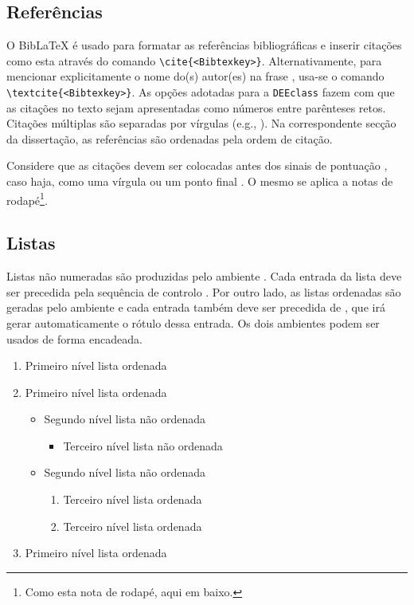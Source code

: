 
\subsection{Referências}

O Bib\LaTeX{} é usado para formatar as referências bibliográficas e inserir citações como esta \cite{Gupta97} através do comando \verb|\cite{<Bibtexkey>}|. Alternativamente, para mencionar explicitamente o nome do(s) autor(es) na frase \textcite{Delorme1995}, usa-se o comando \verb|\textcite{<Bibtexkey>}|. As opções adotadas para a \verb|DEEclass| fazem com que as citações no texto sejam apresentadas como números entre parênteses retos. Citações múltiplas são separadas por vírgulas (e.g., \cite{Lipsum2008,Li2000,Candy1992}). Na correspondente secção da dissertação, as referências são ordenadas pela ordem de citação. 

Considere que as citações \cite{W3C2005,ATmega128A2019} devem ser colocadas antes dos sinais de pontuação \cite{Candy1992}, caso haja, como uma vírgula ou um ponto final \cite{IEA2024}. O mesmo se aplica a notas de rodapé\footnote{Como esta nota de rodapé, aqui em baixo.}.


\subsection{Listas}

Listas não numeradas são produzidas pelo ambiente . Cada entrada da lista deve ser precedida pela sequência de controlo . Por outro lado, as listas ordenadas são geradas pelo ambiente  e cada entrada também deve ser precedida de , que irá gerar automaticamente o rótulo dessa entrada. Os dois ambientes podem ser usados de forma encadeada.

\begin{enumerate}
   \item Primeiro nível lista ordenada
   \item Primeiro nível lista ordenada
   \begin{itemize}
     \item Segundo nível lista não ordenada
     \begin{itemize}
       \item Terceiro nível lista não ordenada
     \end{itemize}      
     \item Segundo nível lista não ordenada
     \begin{enumerate}
       \item Terceiro nível lista ordenada
       \item Terceiro nível lista ordenada
     \end{enumerate}    
   \end{itemize}
   \item Primeiro nível lista ordenada   
\end{enumerate} 

